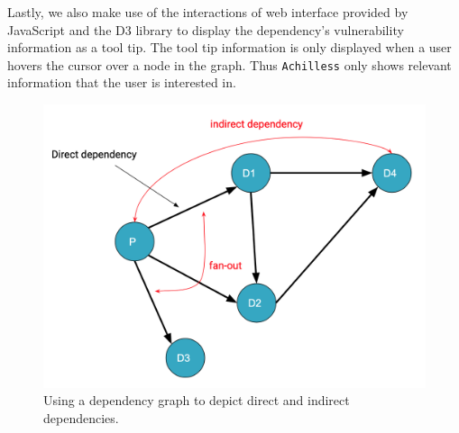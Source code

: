 \documentclass[conference]{IEEEtran}
\begin{document}
    Lastly, we also make use of the interactions of web interface provided by JavaScript and the D3 library to display the dependency's vulnerability information as a tool tip. The tool tip information is only displayed when a user hovers the cursor over a node in the graph.
    Thus \texttt{Achilless} only shows relevant information that the user is interested in. 
        


	\begin{figure}
		\centering
		\includegraphics[width=0.9\linewidth]{Figures/Viz-concept-2}
		\caption{Using a dependency graph to depict direct and indirect dependencies.}
		\label{fig:viz-concept-2}
	\end{figure}
	
\end{document}
